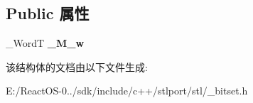 \subsection*{Public 属性}
\begin{DoxyCompactItemize}
\item 
\mbox{\label{struct___base__bitset_3_011_u_l_01_4_a3cecb9fafbf1929c9e55eaf36ee58cbc}} 
\+\_\+\+WordT {\bfseries \+\_\+\+M\+\_\+w}
\end{DoxyCompactItemize}


该结构体的文档由以下文件生成\+:\begin{DoxyCompactItemize}
\item 
E\+:/\+React\+O\+S-\/0../sdk/include/c++/stlport/stl/\+\_\+bitset.\+h\end{DoxyCompactItemize}
